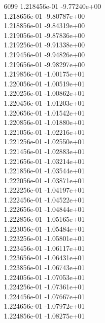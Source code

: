6099	1.218456e-01	-9.77240e+00	\\ 	1.218656e-01	-9.80787e+00	\\ 	1.218856e-01	-9.84319e+00	\\ 	1.219056e-01	-9.87836e+00	\\ 	1.219256e-01	-9.91338e+00	\\ 	1.219456e-01	-9.94826e+00	\\ 	1.219656e-01	-9.98297e+00	\\ 	1.219856e-01	-1.00175e+01	\\ 	1.220056e-01	-1.00519e+01	\\ 	1.220256e-01	-1.00862e+01	\\ 	1.220456e-01	-1.01203e+01	\\ 	1.220656e-01	-1.01542e+01	\\ 	1.220856e-01	-1.01880e+01	\\ 	1.221056e-01	-1.02216e+01	\\ 	1.221256e-01	-1.02550e+01	\\ 	1.221456e-01	-1.02883e+01	\\ 	1.221656e-01	-1.03214e+01	\\ 	1.221856e-01	-1.03544e+01	\\ 	1.222056e-01	-1.03871e+01	\\ 	1.222256e-01	-1.04197e+01	\\ 	1.222456e-01	-1.04522e+01	\\ 	1.222656e-01	-1.04844e+01	\\ 	1.222856e-01	-1.05165e+01	\\ 	1.223056e-01	-1.05484e+01	\\ 	1.223256e-01	-1.05801e+01	\\ 	1.223456e-01	-1.06117e+01	\\ 	1.223656e-01	-1.06431e+01	\\ 	1.223856e-01	-1.06743e+01	\\ 	1.224056e-01	-1.07053e+01	\\ 	1.224256e-01	-1.07361e+01	\\ 	1.224456e-01	-1.07667e+01	\\ 	1.224656e-01	-1.07972e+01	\\ 	1.224856e-01	-1.08275e+01	\\ \hline

